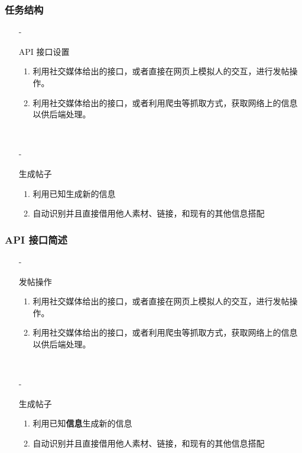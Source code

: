 \documentclass[../Postbot.tex]{subfiles}
\begin{document}
    
    \begin{frame}
        \frametitle{任务结构}
        \begin{itemize}
            \item[-]{
                API 接口设置
                \begin{enumerate}
                    \item 利用社交媒体给出的接口，或者直接在网页上模拟人的交互，进行发帖操作。
                    \item 利用社交媒体给出的接口，或者利用爬虫等抓取方式，获取网络上的信息以供后端处理。
                \end{enumerate}
                \hspace*{\fill}\\
                }
            \item[-]{
                生成帖子
                \begin{enumerate}
                    \item 利用已知生成新的信息
                    \item 自动识别并且直接借用他人素材、链接，和现有的其他信息搭配
                \end{enumerate}
                } 
        \end{itemize}
    \end{frame}


    \begin{frame}
        \frametitle{API 接口简述}
        \begin{itemize}
            \item[-]{
                发帖操作
                \begin{enumerate}
                    \item 利用社交媒体给出的接口，或者直接在网页上模拟人的交互，进行发帖操作。
                    \item 利用社交媒体给出的接口，或者利用爬虫等抓取方式，获取网络上的信息以供后端处理。
                \end{enumerate}
                \hspace*{\fill}\\
                }
            \item[-]{
                生成帖子
                \begin{enumerate}
                    \item 利用已知\textbf{信息}生成新的信息
                    \item 自动识别并且直接借用他人素材、链接，和现有的其他信息搭配
                \end{enumerate}
                } 
        \end{itemize}
    \end{frame}
\end{document}
